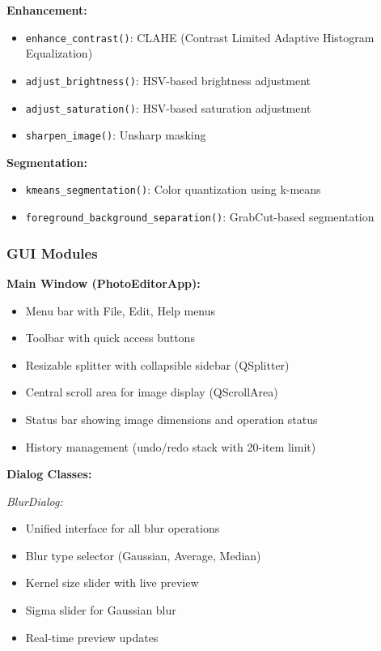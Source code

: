 \documentclass[12pt,a4paper]{article}
\begin{document}
\textbf{Enhancement:}
\begin{itemize}
    \item \texttt{enhance\_contrast()}: CLAHE (Contrast Limited Adaptive Histogram Equalization)
    \item \texttt{adjust\_brightness()}: HSV-based brightness adjustment
    \item \texttt{adjust\_saturation()}: HSV-based saturation adjustment
    \item \texttt{sharpen\_image()}: Unsharp masking
\end{itemize}

\textbf{Segmentation:}
\begin{itemize}
    \item \texttt{kmeans\_segmentation()}: Color quantization using k-means
    \item \texttt{foreground\_background\_separation()}: GrabCut-based segmentation
\end{itemize}

\subsubsection{GUI Modules}

\textbf{Main Window (PhotoEditorApp):}
\begin{itemize}
    \item Menu bar with File, Edit, Help menus
    \item Toolbar with quick access buttons
    \item Resizable splitter with collapsible sidebar (QSplitter)
    \item Central scroll area for image display (QScrollArea)
    \item Status bar showing image dimensions and operation status
    \item History management (undo/redo stack with 20-item limit)
\end{itemize}

\textbf{Dialog Classes:}

\textit{BlurDialog:}
\begin{itemize}
    \item Unified interface for all blur operations
    \item Blur type selector (Gaussian, Average, Median)
    \item Kernel size slider with live preview
    \item Sigma slider for Gaussian blur
    \item Real-time preview updates
\end{itemize}
\end{document}

